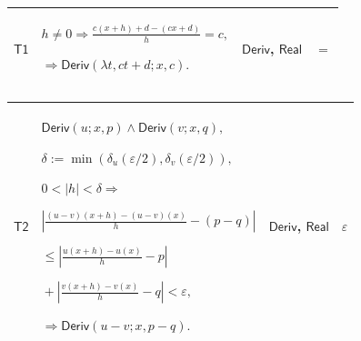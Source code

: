 \documentclass[11pt]{amsart}
\newlength{\FTCFourColumnBody}
\begin{document}
{\begin{tabular}
\end{tabular}%
\par\setlength{\parskip}{0pt}\nointerlineskip
\noindent
\begin{tabular}{|@{}>{\centering\arraybackslash}m{0.078431\FTCFourColumnBody}|>{\centering\arraybackslash}m{0.535947\FTCFourColumnBody}|>{\centering\arraybackslash}m{0.281045\FTCFourColumnBody}|>{\centering\arraybackslash}m{0.104575\FTCFourColumnBody}|}\hline
\hypertarget{proof:T1}{$\displaystyle \textsf{T1}$} & $\displaystyle h\ne0\Rightarrow\frac{c(x+h)+d-(cx+d)}h=c,$\par
$\displaystyle \Rightarrow\textsf{Deriv}(\lambda t,ct+d;x,c).$ & \hyperlink{def:Deriv}{$\displaystyle \textsf{Deriv}$}, \hyperlink{ax:Real}{$\displaystyle \textsf{Real}$} & $\displaystyle =$\\ \hline
\end{tabular}%
\par\setlength{\parskip}{0pt}\nointerlineskip
\noindent
\begin{tabular}{|@{}>{\centering\arraybackslash}m{0.078431\FTCFourColumnBody}|>{\centering\arraybackslash}m{0.535947\FTCFourColumnBody}|>{\centering\arraybackslash}m{0.281045\FTCFourColumnBody}|>{\centering\arraybackslash}m{0.104575\FTCFourColumnBody}|}\hline
\hypertarget{proof:T2}{$\displaystyle \textsf{T2}$} & $\displaystyle \textsf{Deriv}(u;x,p)\land\textsf{Deriv}(v;x,q),$\par
$\displaystyle \delta:=\min(\delta_u(\varepsilon/2),\delta_v(\varepsilon/2)),$\par
$\displaystyle 0<|h|<\delta\Rightarrow$\par
$\displaystyle \left|\frac{(u-v)(x+h)-(u-v)(x)}h-(p-q)\right|$\par
$\displaystyle {}\le\left|\frac{u(x+h)-u(x)}h-p\right|$\par
$\displaystyle {}+\left|\frac{v(x+h)-v(x)}h-q\right|<\varepsilon,$\par
$\displaystyle \Rightarrow\textsf{Deriv}(u-v;x,p-q).$ & \hyperlink{def:Deriv}{$\displaystyle \textsf{Deriv}$}, \hyperlink{ax:Real}{$\displaystyle \textsf{Real}$} & $\displaystyle \varepsilon$\\ \hline
\end{tabular}%
\par\setlength{\parskip}{0pt}\nointerlineskip
\noindent
\begin{tabular}{|@{}>{\centering\arraybackslash}m{0.078431\FTCFourColumnBody}|>{\centering\arraybackslash}m{0.535947\FTCFourColumnBody}|>{\centering\arraybackslash}m{0.281045\FTCFourColumnBody}|>{\centering\arraybackslash}m{0.104575\FTCFourColumnBody}|}\hline

\end{tabular}}
\end{document}
